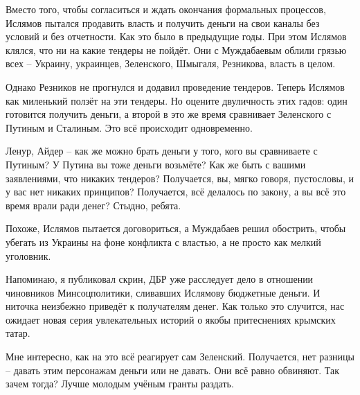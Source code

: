 Вместо того, чтобы согласиться и ждать окончания формальных процессов, Ислямов
пытался продавить власть и получить деньги на свои каналы без условий и без
отчетности. Как это было в предыдущие годы. При этом Ислямов клялся, что ни на
какие тендеры не пойдёт. Они с Муждабаевым облили грязью всех – Украину,
украинцев, Зеленского, Шмыгаля, Резникова, власть в целом.

Однако Резников не прогнулся и додавил проведение тендеров. Теперь Ислямов как
миленький ползёт на эти тендеры. Но оцените двуличность этих гадов: один
готовится получить деньги, а второй в это же время сравнивает Зеленского с
Путиным и Сталиным. Это всё происходит одновременно. 

Ленур, Айдер – как же можно брать деньги у того, кого вы сравниваете с Путиным?
У Путина вы тоже деньги возьмёте? Как же быть с вашими заявлениями, что никаких
тендеров? Получается, вы, мягко говоря, пустословы, и у вас нет никаких
принципов? Получается, всё делалось по закону, а вы всё это время врали ради
денег? Стыдно, ребята.  

Похоже, Ислямов пытается договориться, а Муждабаев решил обострить, чтобы
убегать из Украины на фоне конфликта с властью, а не просто как мелкий
уголовник. 

Напоминаю, я публиковал скрин, ДБР уже расследует дело в отношении чиновников
Минсоцполитики, сливавших Ислямову бюджетные деньги. И ниточка неизбежно
приведёт к получателям денег. Как только это случится, нас ожидает новая серия
увлекательных историй о якобы притеснениях крымских татар. 

Мне интересно, как на это всё реагирует сам Зеленский. Получается, нет разницы
– давать этим персонажам деньги или не давать. Они всё равно обвиняют. Так
зачем тогда? Лучше молодым учёным гранты раздать.

